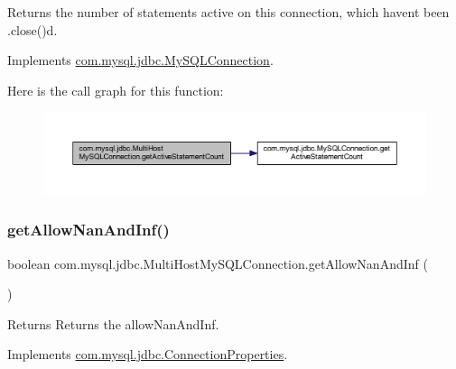 Returns the number of statements active on this connection, which haven\textquotesingle{}t been .close()d. 

Implements \mbox{\hyperlink{interfacecom_1_1mysql_1_1jdbc_1_1_my_s_q_l_connection_aa42802b4debbacd9680e2ca0b70fd53d}{com.\+mysql.\+jdbc.\+My\+S\+Q\+L\+Connection}}.

Here is the call graph for this function\+:
\nopagebreak
\begin{figure}[H]
\begin{center}
\leavevmode
\includegraphics[width=350pt]{classcom_1_1mysql_1_1jdbc_1_1_multi_host_my_s_q_l_connection_a88b613d50112e08095b5f72017b4deea_cgraph}
\end{center}
\end{figure}
\mbox{\label{classcom_1_1mysql_1_1jdbc_1_1_multi_host_my_s_q_l_connection_a3f62430d18cd00a4f9e11a0271ad46af}} 
\subsubsection{\texorpdfstring{get\+Allow\+Nan\+And\+Inf()}{getAllowNanAndInf()}}
{\footnotesize\ttfamily boolean com.\+mysql.\+jdbc.\+Multi\+Host\+My\+S\+Q\+L\+Connection.\+get\+Allow\+Nan\+And\+Inf (\begin{DoxyParamCaption}{ }\end{DoxyParamCaption})}

\begin{DoxyReturn}{Returns}
Returns the allow\+Nan\+And\+Inf. 
\end{DoxyReturn}


Implements \mbox{\hyperlink{interfacecom_1_1mysql_1_1jdbc_1_1_connection_properties_a2da790a00e98b06833dc0856c42d638a}{com.\+mysql.\+jdbc.\+Connection\+Properties}}.

